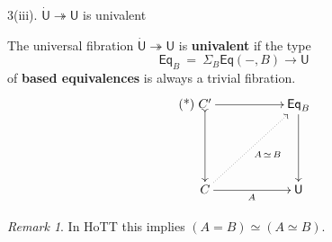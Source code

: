 \documentclass[handout]{beamer}
\newcommand{\myemph}[1]{\textbf{#1}}    %
\renewcommand{\epi}{\twoheadrightarrow}
\newcommand{\U}{\mathsf{U}}
\newcommand{\UU}{\dot{\mathsf{U}}}
\newcommand{\V}{\mathsf{V}}
\theoremstyle{remark}
\newtheorem*{remark}{Remark}
\begin{document}
%
\begin{frame}{3(iii). $\UU\epi\U$ is univalent}

The universal fibration $\UU\epi\U$ is \myemph{univalent} if the type
$$\mathsf{Eq}_B\ =\ \Sigma_B\mathsf{Eq}(-, B) \to \U$$ 
 of \myemph{based equivalences} is always a trivial fibration.
\begin{equation}\tag{*}
\xymatrix{
C' \ar@{>->}[dd] \ar[rr] &&  \mathsf{Eq}_B \ar[dd]  \\
\\
C \ar@{..>}[rruu]_{A\, \simeq\, B} \ar[rr]_{A} && \U
}
\end{equation}
\begin{remark}
In HoTT this implies $(A = B) \simeq (A\simeq B)$.
\end{remark}
\end{frame}
\end{document}
